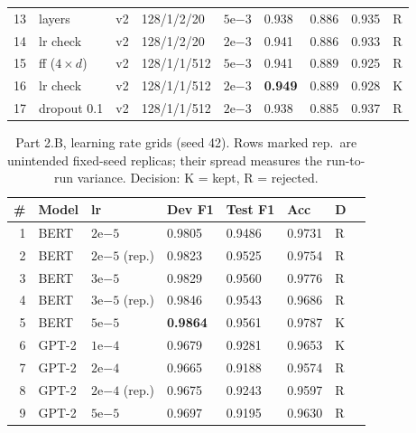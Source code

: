 \documentclass[a4paper]{article}
\begin{document}
\begin{table}[t]
\begin{tabular}{@{}rllllllll@{}}
    13 & layers      & v2   & 128/1/2/20  & $5\mathrm{e}{-3}$ & 0.938 & 0.886 & 0.935 & R \\
    14 & lr check    & v2   & 128/1/2/20  & $2\mathrm{e}{-3}$ & 0.941 & 0.886 & 0.933 & R \\
    15 & ff ($4 \times d$) & v2 & 128/1/1/512 & $5\mathrm{e}{-3}$ & 0.941 & 0.889 & 0.925 & R \\
    16 & lr check    & v2   & 128/1/1/512 & $2\mathrm{e}{-3}$ & \textbf{0.949} & 0.889 & 0.928 & K \\
    17 & dropout 0.1 & v2   & 128/1/1/512 & $2\mathrm{e}{-3}$ & 0.938 & 0.885 & 0.937 & R \\
    \bottomrule
  \end{tabular}
\end{table}

\begin{table}[t]
  \centering
  \caption{Part 2.B, learning rate grids (seed 42). Rows marked rep.\ are unintended fixed-seed replicas; their spread measures the run-to-run variance. Decision: K = kept, R = rejected.}
  \label{tab:partb}
  \footnotesize
  \begin{tabular}{@{}rlllllll@{}}
    \toprule
    \# & Model & lr & Dev F1 & Test F1 & Acc & D \\
    \midrule
    1 & BERT & $2\mathrm{e}{-5}$        & 0.9805 & 0.9486 & 0.9731 & R \\
    2 & BERT & $2\mathrm{e}{-5}$ (rep.) & 0.9823 & 0.9525 & 0.9754 & R \\
    3 & BERT & $3\mathrm{e}{-5}$        & 0.9829 & 0.9560 & 0.9776 & R \\
    4 & BERT & $3\mathrm{e}{-5}$ (rep.) & 0.9846 & 0.9543 & 0.9686 & R \\
    5 & BERT & $5\mathrm{e}{-5}$        & \textbf{0.9864} & 0.9561 & 0.9787 & K \\
    6 & GPT-2 & $1\mathrm{e}{-4}$        & 0.9679 & 0.9281 & 0.9653 & K \\
    7 & GPT-2 & $2\mathrm{e}{-4}$        & 0.9665 & 0.9188 & 0.9574 & R \\
    8 & GPT-2 & $2\mathrm{e}{-4}$ (rep.) & 0.9675 & 0.9243 & 0.9597 & R \\
    9 & GPT-2 & $5\mathrm{e}{-5}$        & 0.9697 & 0.9195 & 0.9630 & R \\
    \bottomrule
  \end{tabular}
\end{table}
\end{document}
